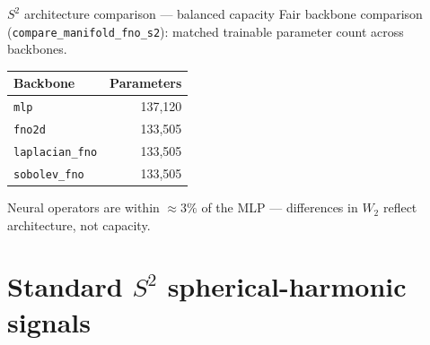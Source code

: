 \documentclass[aspectratio=169,11pt]{beamer}
\begin{document}
\begin{frame}{\texorpdfstring{$S^2$}{S2} architecture comparison --- balanced capacity}
  \small
  Fair backbone comparison (\texttt{compare\_manifold\_fno\_s2}): matched trainable parameter count across backbones.

  \vspace{0.4em}
  \begin{table}
    \centering
    \begin{tabular}{@{}lr@{}}
      \toprule
      \textbf{Backbone} & \textbf{Parameters} \\
      \midrule
      \texttt{mlp} & 137{,}120 \\
      \texttt{fno2d} & 133{,}505 \\
      \texttt{laplacian\_fno} & 133{,}505 \\
      \texttt{sobolev\_fno} & 133{,}505 \\
      \bottomrule
    \end{tabular}
  \end{table}

  \vspace{0.35em}
  \normalsize
  Neural operators are within $\approx 3\%$ of the MLP --- differences in $W_2$ reflect architecture, not capacity.
\end{frame}

\section{Standard \texorpdfstring{$S^2$}{S2} spherical-harmonic signals}
\end{document}
